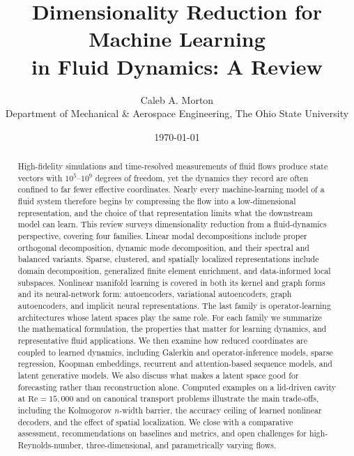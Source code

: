 \documentclass[11pt]{article}
\title{\textbf{Dimensionality Reduction for Machine Learning\\ in Fluid Dynamics: A Review}}
\author{Caleb A. Morton\\[2pt]
  \small Department of Mechanical \& Aerospace Engineering, The Ohio State University}
\date{\today}
\begin{document}
\maketitle

\begin{abstract}
\noindent
High-fidelity simulations and time-resolved measurements of fluid flows produce
state vectors with $10^{5}$--$10^{9}$ degrees of freedom, yet the dynamics they
record are often confined to far fewer effective coordinates. Nearly every
machine-learning model of a fluid system therefore begins by compressing the flow
into a low-dimensional representation, and the choice of that representation
limits what the downstream model can learn. This review surveys dimensionality
reduction from a fluid-dynamics perspective, covering four families.
Linear modal decompositions include proper orthogonal decomposition, dynamic
mode decomposition, and their spectral and balanced variants.
Sparse, clustered, and spatially localized representations include domain
decomposition, generalized finite element enrichment, and data-informed local
subspaces. Nonlinear manifold learning is covered in both its kernel and graph
forms and its neural-network form: autoencoders, variational autoencoders, graph
autoencoders, and implicit neural representations. The last family is
operator-learning architectures whose latent spaces play the same role. For
each family we summarize the mathematical formulation, the properties that
matter for learning dynamics, and representative fluid applications. We then
examine how reduced coordinates are coupled to learned dynamics, including
Galerkin and operator-inference models, sparse regression, Koopman embeddings,
recurrent and attention-based sequence models, and latent generative models. We
also discuss what makes a latent space good for forecasting rather than
reconstruction alone. Computed examples on a lid-driven cavity at
$\mathrm{Re}=15{,}000$ and on canonical transport problems illustrate the main
trade-offs, including the Kolmogorov $n$-width barrier, the accuracy ceiling of
learned nonlinear decoders, and the effect of spatial localization. We close
with a comparative assessment, recommendations on baselines and metrics, and
open challenges for high-Reynolds-number, three-dimensional, and
parametrically varying flows.
\end{abstract}

\tableofcontents
\newpage











\end{document}
